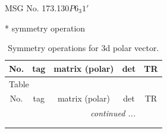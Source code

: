 \documentclass[fleqn,8pt]{jsarticle}
\begin{document}
\setcounter{MaxMatrixCols}{32}

\renewcommand{\tablename}{Table~}
\renewcommand{\figurename}{Figure~}
\begin{center}
\LARGE
MSG No. 173.130\quad$P6_{3}1'$
\end{center}
* symmetry operation
\renewcommand{\arraystretch}{1.3}
\begin{longtable}{ccccc}
\caption{Symmetry operations for 3d polar vector.}
 \\
 \hline \hline
No. & tag & matrix (polar) & det & TR \\ \hline \endfirsthead

\multicolumn{4}{l}{\tablename\ \thetable{}} \\
 \hline \hline
No. & tag & matrix (polar) & det & TR \\ \hline \endhead

 \hline \hline
\multicolumn{4}{r}{\footnotesize\it continued ...} \\ \endfoot

 \hline \hline
\multicolumn{4}{r}{} \\ \endlastfoot


\end{longtable}
\end{document}
